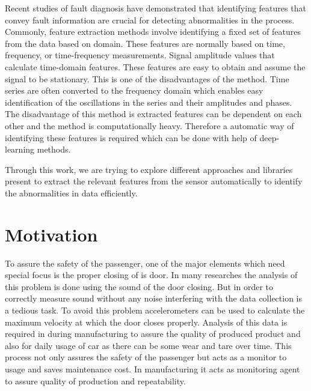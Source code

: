 Recent studies of fault diagnosis have demonstrated that identifying features that convey fault information are crucial for detecting abnormalities in the process. Commonly, feature extraction methods involve identifying a fixed set of features from the data based on domain. These features are normally based on time, frequency, or time-frequency measurements. Signal amplitude values that calculate time-domain features. These features are easy to obtain and assume the signal to be stationary. This is one of the disadvantages of the method. Time series are often converted to the frequency domain which enables easy identification of the oscillations in the series and their amplitudes and phases. The disadvantage of this method is extracted features can be dependent on each other and the method is computationally heavy. Therefore a automatic way of identifying these features is required which can be done with help of deep-learning methods.

Through this work, we are trying to explore different approaches and libraries present to extract the relevant features from the sensor automatically to identify the abnormalities in data efficiently.
  
    \section{Motivation}
     
 To assure the safety of the passenger, one of the major elements which need special focus is the proper closing of is door. In many researches the analysis of this problem is done using the sound of the door closing. But in order to correctly measure sound without any noise interfering with the data collection is a tedious task. To avoid this problem accelerometers can be used to calculate the maximum velocity at which the door closes properly. Analysis of this data is required in during manufacturing to assure the quality of produced product and also for daily usage of car as there can be some wear and tare over time. This process not only assures the safety of the passenger but acts as a monitor to usage and saves maintenance cost. In manufacturing it acts as monitoring agent to assure quality of production and repeatability.
   
    
    

